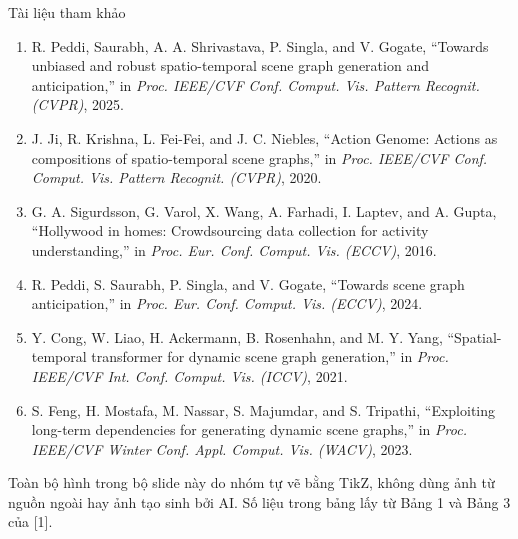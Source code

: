 \documentclass[aspectratio=169,10pt]{beamer}
\newcommand{\muted}[1]{\textcolor{MutedTxt}{#1}}
\newcommand{\cit}[1]{{\footnotesize\textcolor{hcmusblue}{[#1]}}}
\begin{document}
\begin{frame}{Tài liệu tham khảo}
{\footnotesize
\begin{enumerate}\itemsep4pt
  \item R. Peddi, Saurabh, A. A. Shrivastava, P. Singla, and V. Gogate,
        ``Towards unbiased and robust spatio-temporal scene graph generation and
        anticipation,'' in \emph{Proc. IEEE/CVF Conf. Comput. Vis. Pattern
        Recognit. (CVPR)}, 2025.
  \item J. Ji, R. Krishna, L. Fei-Fei, and J. C. Niebles, ``Action Genome:
        Actions as compositions of spatio-temporal scene graphs,'' in
        \emph{Proc. IEEE/CVF Conf. Comput. Vis. Pattern Recognit. (CVPR)}, 2020.
  \item G. A. Sigurdsson, G. Varol, X. Wang, A. Farhadi, I. Laptev, and A.
        Gupta, ``Hollywood in homes: Crowdsourcing data collection for activity
        understanding,'' in \emph{Proc. Eur. Conf. Comput. Vis. (ECCV)}, 2016.
  \item R. Peddi, S. Saurabh, P. Singla, and V. Gogate, ``Towards scene graph
        anticipation,'' in \emph{Proc. Eur. Conf. Comput. Vis. (ECCV)}, 2024.
  \item Y. Cong, W. Liao, H. Ackermann, B. Rosenhahn, and M. Y. Yang,
        ``Spatial-temporal transformer for dynamic scene graph generation,'' in
        \emph{Proc. IEEE/CVF Int. Conf. Comput. Vis. (ICCV)}, 2021.
  \item S. Feng, H. Mostafa, M. Nassar, S. Majumdar, and S. Tripathi,
        ``Exploiting long-term dependencies for generating dynamic scene
        graphs,'' in \emph{Proc. IEEE/CVF Winter Conf. Appl. Comput. Vis.
        (WACV)}, 2023.
\end{enumerate}}
\vspace{4pt}
\muted{\scriptsize Toàn bộ hình trong bộ slide này do nhóm tự vẽ bằng TikZ, không
dùng ảnh từ nguồn ngoài hay ảnh tạo sinh bởi AI. Số liệu trong bảng lấy từ Bảng 1
và Bảng 3 của \cit{1}.}
\end{frame}
\end{document}
